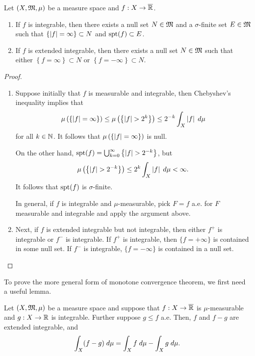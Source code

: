 \documentclass[a4paper]{article}
\begin{document}
\begin{cor}
Let $(X, \mathfrak{M}, \mu)$ be a measure space and $f: X \to \overline{\mathbb{R}}$.
\begin{enumerate}
  \item If $f$ is integrable, then there exists
  a null set $N \in \mathfrak{M}$ and a $\sigma$-finite set $E \in \mathfrak{M}$
  such that
  $\left\{ \left\lvert f\right\rvert = \infty \right\} \subset N$
  and $\operatorname{spt}(f) \subset E$.

  \item If $f$ is extended integrable, then there
  exists a null set $N \in \mathfrak{M}$ such that
  either $\left\{ f = \infty \right\} \subset N$
  or $\left\{ f = -\infty \right\} \subset N$.
\end{enumerate}
\end{cor}

\begin{proof}
\begin{enumerate}
  \item Suppose initially that $f$ is measurable and integrable,
  then Chebyshev's inequality implies that
  \[
  \mu \left( \left\{ \left\lvert f\right\rvert = \infty \right\} \right)
  \leq \mu \left( \left\{ \left\lvert f\right\rvert > 2^k \right\} \right)
  \leq 2^{-k} \int_X \left\lvert f\right\rvert \; d \mu
  \]
  for all $k \in \mathbb{N}$. It follows that
  $\mu \left( \left\{ \left\lvert f\right\rvert = \infty \right\} \right)$
  is null.

  On the other hand, $\operatorname{spt}(f) = \bigcup_{k=0}^\infty \left\{ \left\lvert f\right\rvert
  > 2^{-k} \right\}$, but
  \[
  \mu \left( \left\{ \left\lvert f\right\rvert > 2^{-k} \right\} \right)
  \leq 2^k \int_X \left\lvert f\right\rvert \; d \mu < \infty.
  \]
  It follows that $\operatorname{spt}(f)$ is $\sigma$-finite.

  In general, if $f$ is integrable and $\mu$-measurable,
  pick $F = f$ a.e. for $F$ measurable and integrable and
  apply the argument above.

  \item Next, if $f$ is extended integrable but not integrable,
  then either $f^+$ is integrable or $f^-$ is integrable.
  If $f^+$ is integrable, then $\{f = +\infty\}$ is
  contained in some null set. If $f^-$ is integrable,
  $\{f = -\infty\}$ is contained in a null set.
\end{enumerate}
\end{proof}

To prove the more general form of monotone convergence theorem,
we first need a useful lemma.

\begin{lemma}
Let $(X, \mathfrak{M}, \mu)$ be a measure space and suppose that
$f : X \to \overline{\mathbb{R}}$ is $\mu$-measurable and $g : X \to \mathbb{R}$
is integrable. Further suppose $g \leq f$ a.e. Then, $f$
and $f - g$ are extended integrable, and
\[
\int_X (f - g) \; d \mu = \int_X f \; d \mu - \int_X g \; d \mu.
\]
\end{lemma}
\end{document}
